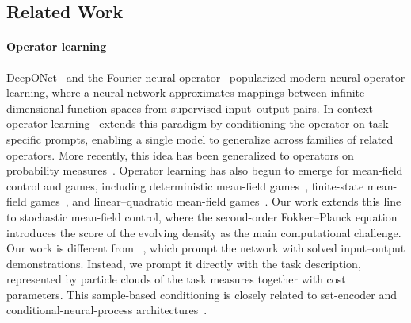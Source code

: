 \documentclass[preprint]{elsarticle}
\begin{document}
\subsection{Related Work}\label{sec:related}

\paragraph{Operator learning}
DeepONet~\cite{lu2021deeponet} and the Fourier neural operator~\cite{li2021fno} popularized modern neural operator learning, where a neural network approximates mappings between infinite-dimensional function spaces from supervised input--output pairs. In-context operator learning~\cite{yang2023icon} extends this paradigm by conditioning the operator on task-specific prompts, enabling a single model to generalize across families of related operators. More recently, this idea has been generalized to operators on probability measures~\cite{cole2026incontextoperatorlearningspace}. Operator learning has also begun to emerge for mean-field control and games, including deterministic mean-field games~\cite{huang2025unsupervised}, finite-state mean-field games~\cite{hofgard2026operator}, and linear--quadratic mean-field games~\cite{firoozi2025simultaneously}. Our work extends this line to stochastic mean-field control, where the second-order Fokker--Planck equation introduces the score of the evolving density as the main computational challenge. Our work is different from ~\cite{garg2022icl}, which prompt the network  with solved input--output demonstrations. Instead, we prompt it directly with the task description, represented by particle clouds of the task measures together with cost parameters. This sample-based conditioning is closely related to set-encoder and conditional-neural-process architectures~\cite{garnelo2018cnp,zaheer2017deepsets,lee2019settransformer}.
\end{document}

